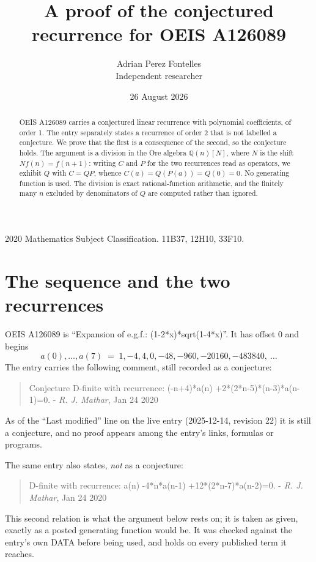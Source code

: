 \documentclass[11pt,a4paper]{article}
\title{A proof of the conjectured recurrence for OEIS A126089}
\author{Adrian Perez Fontelles\\ \small Independent researcher}
\date{26 August 2026}
\theoremstyle{plain}
\theoremstyle{definition}
\begin{document}
\maketitle

\begin{abstract}
OEIS A126089 carries a conjectured linear recurrence with polynomial coefficients, of
order 1. The entry separately states a recurrence of order 2 that is not
labelled a conjecture. We prove that the first is a consequence of the second, so the
conjecture holds. The argument is a division in the Ore algebra
$\mathbb{Q}(n)[N]$, where $N$ is the shift $Nf(n)=f(n+1)$: writing $C$ and $P$ for the two
recurrences read as operators, we exhibit $Q$ with $C=QP$, whence
$C(a)=Q(P(a))=Q(0)=0$. No generating function is used. The division is exact
rational-function arithmetic, and the finitely many $n$ excluded by denominators of $Q$
are computed rather than ignored.
\end{abstract}

\noindent\small 2020 Mathematics Subject Classification. 11B37, 12H10, 33F10.\normalsize

\section{The sequence and the two recurrences}

OEIS A126089 is ``Expansion of e.g.f.: (1-2*x)*sqrt(1-4*x)''. It has offset $0$ and begins
\[
a(0),\dots,a(7)\;=\;1, -4, 4, 0, -48, -960, -20160, -483840,\ \dots
\]
The entry carries the following comment, still recorded as a conjecture:
\begin{quote}\small
Conjecture D-finite with recurrence: (-n+4)*a(n) +2*(2*n-5)*(n-3)*a(n-1)=0. - \emph{R. J. Mathar}, Jan 24 2020
\end{quote}
As of the ``Last modified'' line on the live entry (2025-12-14, revision 22) it is still
a conjecture, and no proof appears among the entry's links, formulas or programs.

The same entry also states, \emph{not} as a conjecture:
\begin{quote}\small
D-finite with recurrence: a(n) -4*n*a(n-1) +12*(2*n-7)*a(n-2)=0. - \emph{R. J. Mathar}, Jan 24 2020
\end{quote}
This second relation is what the argument below rests on; it is taken as given, exactly as
a posted generating function would be. It was checked against the entry's own DATA before
being used, and holds on every published term it reaches.
\end{document}
